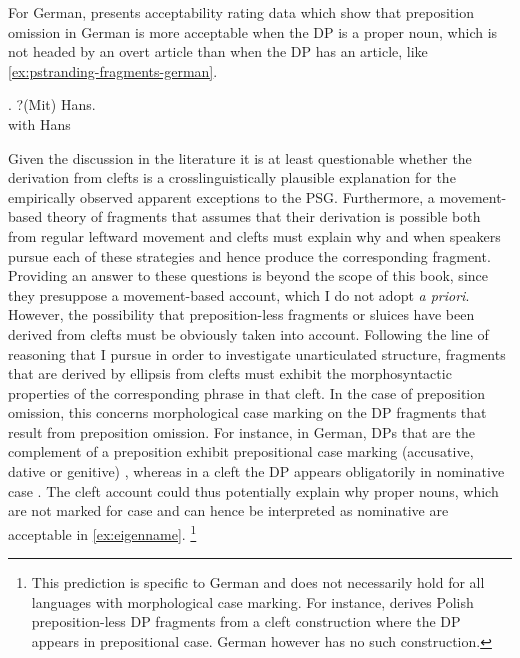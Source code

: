 For German, \citet{lemkeaccepted} presents acceptability rating data which show that preposition omission in German is more acceptable when the DP is a proper noun, which is not headed by an overt article \Next than when the DP has an article, like \ref{ex:pstranding-fragments-german}.

\exg. 
?(Mit) Hans.\label{ex:eigenname}\\
with Hans\\

Given the discussion in the literature it is at least questionable whether the derivation from clefts is a crosslinguistically plausible explanation for the empirically observed apparent exceptions to the PSG. Furthermore, a movement-based theory of fragments that assumes that their derivation is possible both from regular leftward movement and clefts must explain why and when speakers pursue each of these strategies and hence produce the corresponding fragment. Providing an answer to these questions is beyond the scope of this book, since they presuppose a movement-based account, which I do not adopt \textit{a priori}. However, the possibility that preposition-less fragments or sluices have been derived from clefts must be obviously taken into account. Following the line of reasoning that I pursue in order to investigate unarticulated structure, fragments that are derived by ellipsis from clefts must exhibit the morphosyntactic properties of the corresponding phrase in that cleft. In the case of preposition omission, this concerns morphological case marking on the DP fragments that result from preposition omission. For instance, in German, DPs that are the complement of a preposition exhibit prepositional case marking (accusative, dative or genitive) \Next[a], whereas in a cleft the DP appears obligatorily in nominative case \Next[b]. The cleft account could thus potentially explain why proper nouns, which are not marked for case and can hence be interpreted as nominative are acceptable in \ref{ex:eigenname}.%
%
\footnote{This prediction is specific to German and does not necessarily hold for all languages with morphological case marking. For instance, \citet{szczegielniak2008} derives Polish preposition-less DP fragments from a cleft construction where the DP appears in prepositional case. German however has no such construction.}\afterfn%
